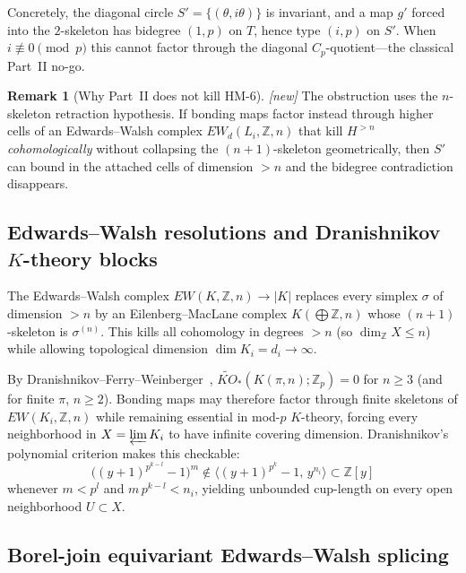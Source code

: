 \documentclass[11pt]{article}
\theoremstyle{definition}
\newtheorem{remark}[theorem]{Remark}
\newcommand{\status}[1]{\textit{\textcolor{black!70}{[#1]}}}
\begin{document}
Concretely, the diagonal circle $S'=\{(\theta,i\theta)\}$ is invariant, and a
map $g'$ forced into the $2$-skeleton has bidegree $(1,p)$ on $T$, hence type
$(i,p)$ on $S'$.  When $i\not\equiv 0\pmod{p}$ this cannot factor through the
diagonal $C_p$-quotient---the classical Part~II no-go.

\begin{remark}[Why Part~II does not kill HM-6]
\label{rmk:williams-depends-on-skeleton}
\status{new}
The obstruction uses the $n$-skeleton retraction hypothesis.  If bonding maps
factor instead through higher cells of an Edwards--Walsh complex
$EW_d(L_i,\mathbb{Z},n)$ that kill $H^{>n}$ \emph{cohomologically} without
collapsing the $(n+1)$-skeleton geometrically, then $S'$ can bound in the
attached cells of dimension $>n$ and the bidegree contradiction disappears.
\end{remark}

\subsection{Edwards--Walsh resolutions and Dranishnikov $K$-theory blocks}
\label{sec:ew-blocks}

The Edwards--Walsh complex $EW(K,\mathbb{Z},n)\to|K|$
\cite{walsh1981,dranishnikov1988,dydakwalsh1993} replaces every simplex
$\sigma$ of dimension $>n$ by an Eilenberg--MacLane complex
$K(\bigoplus\mathbb{Z},n)$ whose $(n+1)$-skeleton is $\sigma^{(n)}$.  This
kills all cohomology in degrees $>n$ (so $\dim_{\mathbb{Z}}X\le n$) while
allowing topological dimension $\dim K_i=d_i\to\infty$.

By Dranishnikov--Ferry--Weinberger~\cite{dfw2006},
$\widetilde{KO}_*(K(\pi,n);\mathbb{Z}_p)=0$ for $n\ge 3$ (and for finite
$\pi$, $n\ge 2$).  Bonding maps may therefore factor through finite skeletons
of $EW(K_i,\mathbb{Z},n)$ while remaining essential in mod-$p$ $K$-theory,
forcing every neighborhood in $X=\varprojlim K_i$ to have infinite covering
dimension.  Dranishnikov's polynomial criterion
\cite[Prop.~3.3]{dranishnikov2016} makes this checkable:
\[
\bigl((y+1)^{p^{k-l}}-1\bigr)^m
\notin
\bigl\langle (y+1)^{p^k}-1,\, y^{n_i}\bigr\rangle
\subset\mathbb{Z}[y]
\]
whenever $m<p^l$ and $m\,p^{k-l}<n_i$, yielding unbounded cup-length on every
open neighborhood $U\subset X$.

\subsection{Borel-join equivariant Edwards--Walsh splicing}
\label{sec:borel-join}
\end{document}
